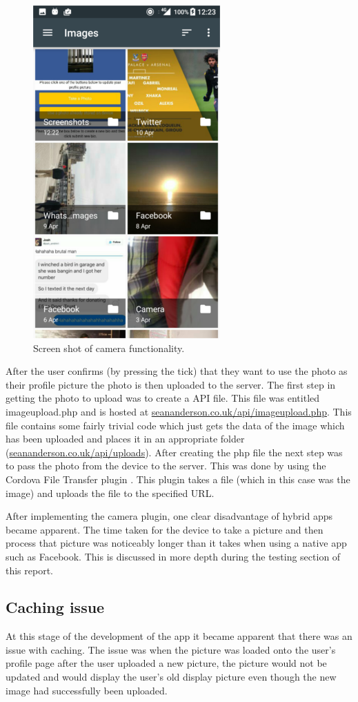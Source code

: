 \begin{center}
\begin{figure}[H]
\includegraphics[scale=0.5]{images/sc9}
\caption{Screen shot of camera functionality.}
\end{figure}
\end{center}

After the user confirms (by pressing the tick) that they want to use the photo as their profile picture the photo is then uploaded to the server. The first step in getting the photo to upload was to create a API file. This file was entitled imageupload.php and is hosted at \url{seananderson.co.uk/api/imageupload.php}. This file contains some fairly trivial code which just gets the data of the image which has been uploaded and places it in an appropriate folder (\url{seananderson.co.uk/api/uploads}). After creating the php file the next step was to pass the photo from the device to the server. This was done by using the Cordova File Transfer plugin \cite{ft}. This plugin takes a file (which in this case was the image) and uploads the file to the specified URL.

After implementing the camera plugin, one clear disadvantage of hybrid apps became apparent. The time taken for the device to take a picture and then process that picture was noticeably longer than it takes when using a native app such as Facebook. This is discussed in more depth during the testing section of this report. 

\subsection{Caching issue}
At this stage of the development of the app it became apparent that there was an issue with caching. The issue was when the picture was loaded onto the user's profile page after the user uploaded a new picture, the picture would not be updated and would display the user's old display picture even though the new image had successfully been uploaded. 

